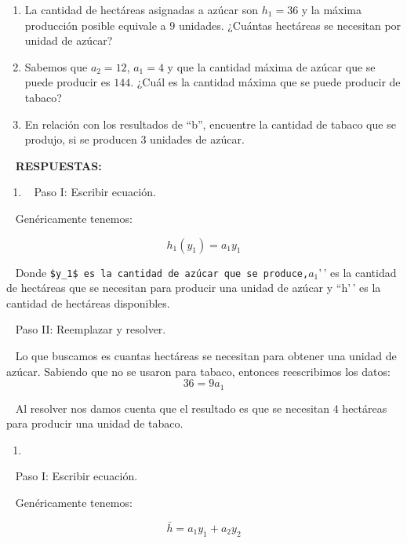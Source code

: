 \documentclass[
  letterpaper,
  DIV=11,
  numbers=noendperiod]{scrreport}
\providecommand{\tightlist}{%
  \setlength{\itemsep}{0pt}\setlength{\parskip}{0pt}}\usepackage{longtable,booktabs,array}
\begin{document}
\begin{enumerate}
\def\labelenumi{\alph{enumi})}
\item
  La cantidad de hectáreas asignadas a azúcar son \(h_1=36\) y la máxima
  producción posible equivale a \(9\) unidades. ¿Cuántas hectáreas se
  necesitan por unidad de azúcar?\\
\item
  Sabemos que \(a_2=12\), \(a_1=4\) y que la cantidad máxima de azúcar
  que se puede producir es \(144\). ¿Cuál es la cantidad máxima que se
  puede producir de tabaco?\\
\item
  En relación con los resultados de ``b'', encuentre la cantidad de
  tabaco que se produjo, si se producen \(3\) unidades de azúcar.\\
\end{enumerate}

~ \textbf{RESPUESTAS:}

\begin{enumerate}
\def\labelenumi{\alph{enumi})}
\tightlist
\item
  ~ Paso I: Escribir ecuación.
\end{enumerate}

~ Genéricamente tenemos:

\[h_1(y_1)=a_1y_1\]

~ Donde
\texttt{\$y\_1\$\textquotesingle{}\textquotesingle{}\ es\ la\ cantidad\ de\ azúcar\ que\ se\ produce,}\(a_1\)'\,'
es la cantidad de hectáreas que se necesitan para producir una unidad de
azúcar y ``h'\,' es la cantidad de hectáreas disponibles.

~ Paso II: Reemplazar y resolver.

~ Lo que buscamos es cuantas hectáreas se necesitan para obtener una
unidad de azúcar. Sabiendo que no se usaron para tabaco, entonces
reescribimos los datos: \[36=9a_1\]

~ Al resolver nos damos cuenta que el resultado es que se necesitan
\(4\) hectáreas para producir una unidad de tabaco.\\

\begin{enumerate}
\def\labelenumi{\alph{enumi})}
\setcounter{enumi}{1}
\tightlist
\item
\end{enumerate}

~ Paso I: Escribir ecuación.

~ Genéricamente tenemos:

\[\bar h=a_1y_1+a_2y_2\]
\end{document}
